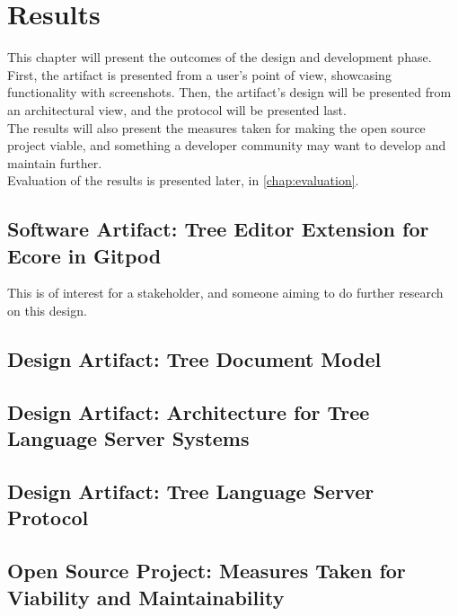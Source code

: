 \chapter{Results}\label{chap:results}

This chapter will present the outcomes of the design and development phase.
First, the artifact is presented from a user's point of view, showcasing functionality with screenshots.
Then, the artifact's design will be presented from an architectural view, and the protocol will be presented last.\\

The results will also present the measures taken for making the \gls{open source} project viable, and something a developer community may want to develop and maintain further.\\

Evaluation of the results is presented later, in \cref{chap:evaluation}.

\section{Software Artifact: Tree Editor Extension for Ecore in Gitpod}

This is of interest for a stakeholder, and someone aiming to do further research on this design.



\section{Design Artifact: Tree Document Model}




\section{Design Artifact: Architecture for Tree Language Server Systems}




\section{Design Artifact: Tree Language Server Protocol}\label{sec:tlsp}




\section{Open Source Project: Measures Taken for Viability and Maintainability}


